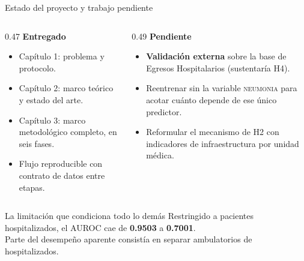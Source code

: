 \documentclass[aspectratio=169,11pt]{beamer}
\newcommand{\resalta}[1]{{\color{vino}\bfseries #1}}
\newcommand{\cifra}[1]{{\color{naranja}\bfseries #1}}
\begin{document}
\begin{frame}{Estado del proyecto y trabajo pendiente}
  \vspace{0.5em}
  \begin{columns}[T,onlytextwidth]
    \begin{column}{0.47\textwidth}
      {\bfseries\color{vino} Entregado}
      \vspace{0.35em}
      {\small
      \begin{itemize}\setlength\itemsep{0.3em}
        \item Capítulo 1: problema y protocolo.
        \item Capítulo 2: marco teórico y estado del arte.
        \item Capítulo 3: marco metodológico completo, en seis fases.
        \item Flujo reproducible con contrato de datos entre etapas.
      \end{itemize}}
    \end{column}
    \begin{column}{0.49\textwidth}
      {\bfseries\color{vino} Pendiente}
      \vspace{0.35em}
      {\small
      \begin{itemize}\setlength\itemsep{0.3em}
        \item \resalta{Validación externa} sobre la base de Egresos
              Hospitalarios (sustentaría H4).
        \item Reentrenar sin la variable \textsc{neumonia} para acotar cuánto
              depende de ese único predictor.
        \item Reformular el mecanismo de H2 con indicadores de infraestructura
              por unidad médica.
      \end{itemize}}
    \end{column}
  \end{columns}

  \vspace{0.9em}
  \begin{center}
  \begin{minipage}{0.90\textwidth}
    \begin{block}{La limitación que condiciona todo lo demás}
      \centering\small
      Restringido a pacientes hospitalizados, el AUROC cae de \cifra{0.9503} a
      \cifra{0.7001}.\\ Parte del desempeño aparente consistía en separar
      ambulatorios de hospitalizados.
    \end{block}
  \end{minipage}
  \end{center}
\end{frame}
\end{document}
